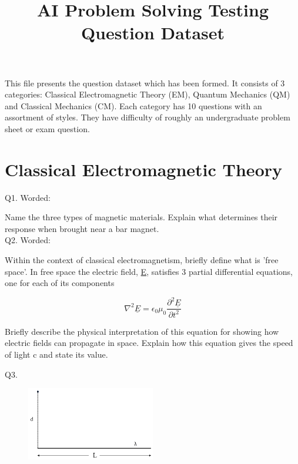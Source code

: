\documentclass[a4paper,11pt]{article}
\begin{document}
\title{AI Problem Solving Testing \\ Question Dataset }
\author{}
\date{}
\maketitle

\vspace{4.0cm} This file presents the question dataset which has been formed. It consists of 3 categories: Classical Electromagnetic Theory (EM), Quantum Mechanics (QM) and Classical Mechanics (CM). Each category has 10 questions with an assortment of styles. They have difficulty of roughly an undergraduate problem sheet or exam question. 

\newpage{}

\section{Classical Electromagnetic Theory}

Q1. Worded: 

Name the three types of magnetic materials. Explain what determines their response when brought near a bar magnet. \\

Q2. Worded:

Within the context of classical electromagnetism, briefly define what is 'free space'. In free space the electric field, \underline{E}, satisfies 3 partial differential equations, one for each of its components

\[
\nabla^{2}\underline{E} =  \epsilon_{0}\mu_{0}\frac{\partial^2 \underline{E}}{\partial t^{2}}
\]

Briefly describe the physical interpretation of this equation for showing how electric fields can propagate in space. Explain how this equation gives the speed of light c and state its value. 

\bigskip

\noindent Q3.

\begin{figure}[h!]
    \centering
    \includegraphics[width=0.5\textwidth]{EMq3figure.PNG}
    \caption*{}
\end{figure}
\end{document}
